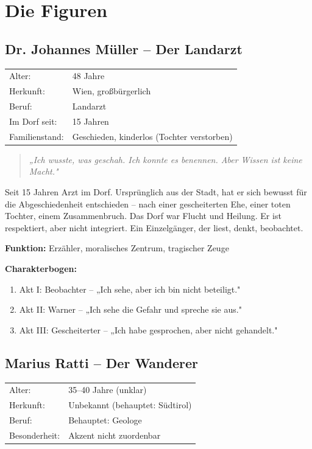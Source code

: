 \documentclass[11pt,a4paper,twoside]{book}
\begin{document}
\chapter{Die Figuren}

\section{Dr. Johannes Müller -- Der Landarzt}

\begin{tcolorbox}[title=Basisdaten]
\begin{tabular}{ll}
Alter: & 48 Jahre \\
Herkunft: & Wien, großbürgerlich \\
Beruf: & Landarzt \\
Im Dorf seit: & 15 Jahren \\
Familienstand: & Geschieden, kinderlos (Tochter verstorben)
\end{tabular}
\end{tcolorbox}

\begin{quote}
\textit{„Ich wusste, was geschah. Ich konnte es benennen. Aber Wissen ist keine Macht."}
\end{quote}

Seit 15 Jahren Arzt im Dorf. Ursprünglich aus der Stadt, hat er sich bewusst für die Abgeschiedenheit entschieden -- nach einer gescheiterten Ehe, einer toten Tochter, einem Zusammenbruch. Das Dorf war Flucht und Heilung. Er ist respektiert, aber nicht integriert. Ein Einzelgänger, der liest, denkt, beobachtet.

\textbf{Funktion:} Erzähler, moralisches Zentrum, tragischer Zeuge

\textbf{Charakterbogen:}
\begin{enumerate}
    \item Akt I: Beobachter -- „Ich sehe, aber ich bin nicht beteiligt."
    \item Akt II: Warner -- „Ich sehe die Gefahr und spreche sie aus."
    \item Akt III: Gescheiterter -- „Ich habe gesprochen, aber nicht gehandelt."
\end{enumerate}

\section{Marius Ratti -- Der Wanderer}

\begin{tcolorbox}[title=Basisdaten]
\begin{tabular}{ll}
Alter: & 35--40 Jahre (unklar) \\
Herkunft: & Unbekannt (behauptet: Südtirol) \\
Beruf: & Behauptet: Geologe \\
Besonderheit: & Akzent nicht zuordenbar
\end{tabular}
\end{tcolorbox}
\end{document}
